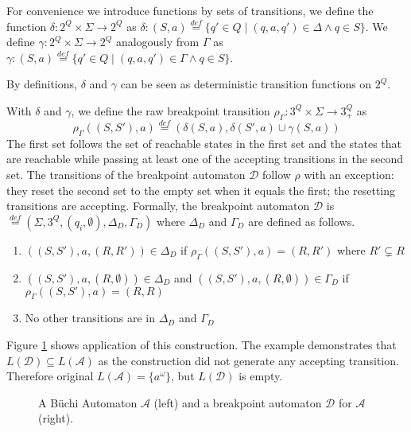 \documentclass[
	digital
nolof, nolot
]{fithesis3}
\newcommand{\cA}{\mathcal{A}}
\newcommand{\cD}{\mathcal{D}}
\newcommand{\lA}{L(\cA)}
\newcommand{\lD}{L(\cD)}
\newcommand{\eqdef}{\overset{def}{=}}
\begin{document}
			For convenience we introduce functions by sets of transitions, we define the function $\delta \colon 2^Q \times \Sigma \rightarrow 2^Q$ as 	
			$\delta\colon (S,a)\eqdef\{q'\in Q \mid  (q,a,q') \in \Delta \land q \in S\}$.
			We define $\gamma:2^Q  \times \Sigma \rightarrow 2^Q$ analogously from $\Gamma$ as $\gamma\colon (S,a)\eqdef\{q'\in Q \mid  (q,a,q') \in \Gamma \land q \in S\}$.
			
			By definitions, $\delta$ and $\gamma$ can be seen as deterministic transition functions on $2^Q$.
			
			With $\delta$ and $\gamma$, we define the raw breakpoint transition
			$\rho_\Gamma \colon 3^Q \times \Sigma \rightarrow 3^Q_+$ as
			\[\rho_\Gamma((S, S'), a) \eqdef(\delta(S, a), \delta(S',a)\cup \gamma(S, a))\]
			The first set follows the set of reachable states in the first set and the states that are reachable while passing at least one of the accepting transitions in the second set.
			The transitions of the breakpoint automaton $\cD$ follow $\rho$ with an exception: they reset the second set to the empty set when it equals the first; the resetting transitions are accepting.
			Formally, the breakpoint automaton $\cD$ is $ \eqdef (\Sigma, 3^Q, (q_i, \emptyset), \Delta_D, \Gamma_D)$ where $\Delta_D$ and $\Gamma_D$ are defined as follows. 
			
			\begin{enumerate}
				\item $((S, S'), a, (R, R')) \in \Delta_D$ if $\rho_\Gamma((S,S'),a)=(R,R')$ where $R' \subsetneq R$
				\item $((S, S'), a, (R, \emptyset)) \in \Delta_D$ and $((S, S'), a, (R, \emptyset)) \in \Gamma_D$ if $\rho_\Gamma((S,S'),a)=(R,R)$ 
				\item No other transitions are in $\Delta_D$ and $\Gamma_D$
			\end{enumerate}
			
			Figure \ref{fig:bp:non-equivalent} shows application of this construction. The example demonstrates that $\lD \subseteq \lA$ as the construction did not generate any accepting transition. Therefore original $\lA=\{a^\omega\}$, but $\lD$ is empty.
			
			
			
			\begin{figure}[ht]
				\begin{center}
					
					
				\end{center}
				\caption{A Büchi Automaton $\cA$ (left) and a breakpoint automaton $\cD$ for $\cA$ (right). }
				\label{fig:bp:non-equivalent}
			\end{figure}
		
\end{document}
